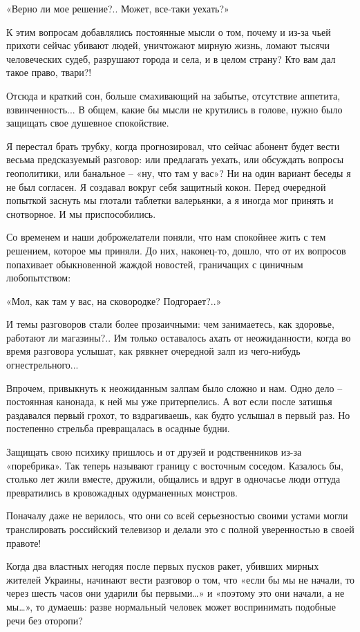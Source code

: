 «Верно ли мое решение?.. Может, все-таки уехать?»

К этим вопросам добавлялись постоянные мысли о том, почему и из-за чьей прихоти
сейчас убивают людей, уничтожают мирную жизнь, ломают тысячи человеческих
судеб, разрушают города и села, и в целом страну? Кто вам дал такое право,
твари?!

Отсюда и краткий сон, больше смахивающий на забытье, отсутствие аппетита,
взвинченность... В общем, какие бы мысли не крутились в голове, нужно было
защищать свое душевное спокойствие.

Я перестал брать трубку, когда прогнозировал, что сейчас абонент будет вести
весьма предсказуемый разговор: или предлагать уехать, или обсуждать вопросы
геополитики, или банальное – «ну, что там у вас»? Ни на один вариант беседы я
не был согласен. Я создавал вокруг себя защитный кокон. Перед очередной
попыткой заснуть мы глотали таблетки валерьянки, а я иногда мог принять и
снотворное. И мы приспособились.

Со временем и наши доброжелатели поняли, что нам спокойнее жить с тем решением,
которое мы приняли. До них, наконец-то, дошло, что от их вопросов попахивает
обыкновенной жаждой новостей, граничащих с циничным любопытством:

«Мол, как там у вас, на сковородке? Подгорает?..»

И темы разговоров стали более прозаичными: чем занимаетесь, как здоровье,
работают ли магазины?.. Им только оставалось ахать от неожиданности, когда во
время разговора услышат, как рявкнет очередной залп из чего-нибудь
огнестрельного...

Впрочем, привыкнуть к неожиданным залпам было сложно и нам. Одно дело –
постоянная канонада, к ней мы уже притерпелись. А вот если после затишья
раздавался первый грохот, то вздрагиваешь, как будто услышал в первый раз. Но
постепенно стрельба превращалась в осадные будни.

Защищать свою психику пришлось и от друзей и родственников из-за «поребрика».
Так теперь называют границу с восточным соседом. Казалось бы, столько лет жили
вместе, дружили, общались и вдруг в одночасье люди оттуда превратились в
кровожадных одурманенных монстров.

Поначалу даже не верилось, что они со всей серьезностью своими устами могли
транслировать российский телевизор и делали это с полной уверенностью в своей
правоте!

Когда два властных негодяя после первых пусков ракет, убивших мирных жителей
Украины, начинают вести разговор о том, что «если бы мы не начали, то через
шесть часов они ударили бы первыми…» и «поэтому это они начали, а не мы…», то
думаешь: разве нормальный человек может воспринимать подобные речи без оторопи?

